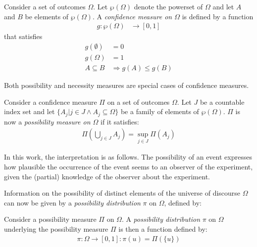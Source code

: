 \begin{definition}
Consider a set of outcomes $\Omega$. Let $\wp(\Omega)$ denote the powerset of $\Omega$ and let $A$ and $B$ be elements of $\wp(\Omega)$. A \emph{confidence measure on $\Omega$} is defined by a function
	\begin{align}
	g : \wp(\Omega) & \rightarrow \left[0,1\right]
	\end{align}
that satisfies
	\begin{align}
	g(\emptyset) &= 0 \\
	g(\Omega) &= 1 	\label{NormalizationProperty} \\
	A \subseteq B &\Rightarrow g(A) \leq g(B) \label{MonotonicityProperty}
	\end{align}
\end{definition}

Both possibility and necessity measures are special cases of confidence measures.



\begin{definition}
Consider a confidence measure $\Pi$ on a set of outcomes $\Omega$. Let $J$ be a countable index set and let $\{ A_{j} | j \in J \wedge A_{j} \subseteq \Omega \}$ be a family of elements of $\wp(\Omega)$. $\Pi$ is now a \emph{possibility measure on $\Omega$} if it satisfies:
	\begin{align}
	\Pi\left(\bigcup_{j \in J} A_{j} \right) = \sup_{j \in J} \Pi(A_{j})
	\end{align}
\end{definition}

In this work, the interpretation is as follows. The possibility of an event expresses how plausible the occurrence of the event seems to an observer of the experiment, given the (partial) knowledge of the observer about the experiment.

Information on the possibility of distinct elements of the universe of discourse $\Omega$ can now be given by a \emph{possibility distribution} $\pi$ on $\Omega$, defined by:

\begin{definition}
Consider a possibility measure $\Pi$ on $\Omega$. A \emph{possibility distribution} $\pi$ on $\Omega$ underlying the possibility measure $\Pi$ is then a function defined by:
	\begin{align}
	\pi : \Omega \rightarrow \left[0, 1\right] : \pi(u) = \Pi(\{u\})
	\end{align}
\end{definition}

